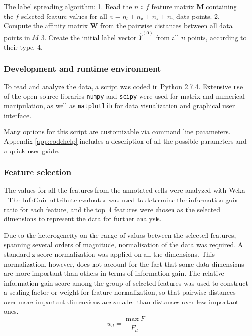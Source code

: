 \documentclass[oneside, a4paper, draft]{memoir} %
\begin{document}
The label spreading algorithm:
1. Read the $n \times f$ feature matrix $\mathbf{M}$ containing the $f$ selected feature values for all
$n = n_l + n_h + n_s + n_u$ data points.
2. Compute the affinity matrix $\textbf{W}$ from the pairwise distances between all data points in $M$
3. Create the initial label vector $\hat{Y}^{(0)}$ from all $n$ points, according to their type.
4. 


\subsubsection{Development and runtime environment}
To read and analyze the data, a script was coded in Python 2.7.4. Extensive use of the open source libraries
\texttt{numpy} and \texttt{scipy} were used for matrix and numerical manipulation, as well as \texttt{matplotlib} for
data visualization and graphical user interface.

Many options for this script are customizable via command line parameters. Appendix \ref{app:codehelp} includes a
description of all the possible parameters and a quick user guide.

\subsubsection{Feature selection}
The values for all the features from the annotated cells were analyzed with Weka \cite{hall2009weka}. The InfoGain
attribute evaluator was used to determine the information gain ratio for each feature, and the top~4
features were chosen as the selected dimensions to represent the data for further analysis.

Due to the heterogeneity on the range of values between the selected features, spanning 
several orders of magnitude, normalization of the data was required. A standard z-score normalization was applied on
all the dimensions. This normalization, however, does not account for the fact that some data dimensions are more
important than others in terms of information gain. The relative information gain score among the group of
selected features was used to construct a scaling factor or weight for feature normalization, so that pairwise
distances over more important dimensions are smaller than distances over less important ones.
\begin{equation}
	w_d = \frac{\max{F}}{F_d}
\end{equation}
\end{document}
